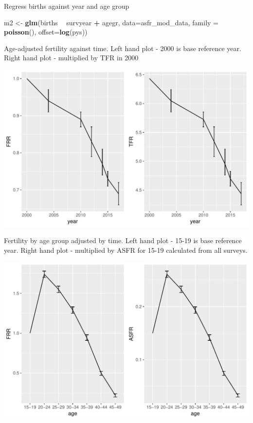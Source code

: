 \documentclass[]{article}
\newenvironment{Shaded}{\begin{snugshade}}{\end{snugshade}}
\newcommand{\KeywordTok}[1]{\textcolor[rgb]{0.13,0.29,0.53}{\textbf{#1}}}
\newcommand{\DataTypeTok}[1]{\textcolor[rgb]{0.13,0.29,0.53}{#1}}
\newcommand{\StringTok}[1]{\textcolor[rgb]{0.31,0.60,0.02}{#1}}
\newcommand{\OperatorTok}[1]{\textcolor[rgb]{0.81,0.36,0.00}{\textbf{#1}}}
\newcommand{\NormalTok}[1]{#1}
\begin{document}
Regress births against year and age group

\begin{Shaded}
\begin{Highlighting}[]

\NormalTok{m2 <-}\StringTok{ }\KeywordTok{glm}\NormalTok{(births }\OperatorTok{~}\StringTok{ }\NormalTok{survyear }\OperatorTok{+}\StringTok{ }\NormalTok{agegr, }\DataTypeTok{data=}\NormalTok{asfr_mod_data, }\DataTypeTok{family =} \KeywordTok{poisson}\NormalTok{(), }\DataTypeTok{offset=}\KeywordTok{log}\NormalTok{(pys))}
\end{Highlighting}
\end{Shaded}

Age-adjusted fertility against time. Left hand plot - 2000 is base
reference year. Right hand plot - multiplied by TFR in 2000

\includegraphics{test_vignette_files/figure-latex/unnamed-chunk-3-1.pdf}

Fertility by age group adjusted by time. Left hand plot - 15-19 is base
reference year. Right hand plot - multiplied by ASFR for 15-19
calculated from all surveys.

\includegraphics{test_vignette_files/figure-latex/unnamed-chunk-4-1.pdf}
\end{document}

